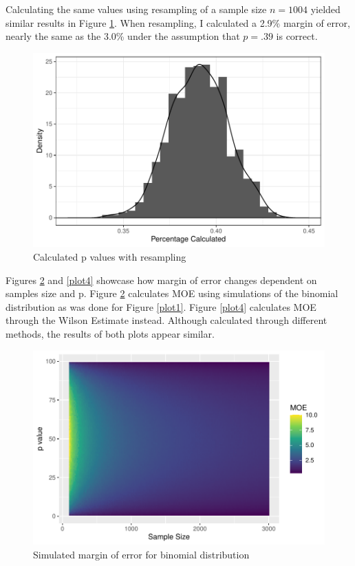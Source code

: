 \documentclass{article}\usepackage[]{graphicx}\usepackage[]{xcolor}
\begin{document}
\begin{multicols}{2}
Calculating the same values using resampling of a sample size $n=1004$ yielded similar results in Figure \ref{plot2}. When resampling, I calculated a 2.9\% margin of error, nearly the same as the 3.0\% under the assumption that $p=.39$ is correct.

\begin{figure}[H]
 \begin{center}
 \includegraphics[scale=0.45]{resample_plot.pdf}
 \caption{Calculated p values with resampling}
 \label{plot2}
 \end{center}
 \end{figure}
 
 Figures \ref{plot3} and \ref{plot4} showcase how margin of error changes dependent on samples size and p. Figure \ref{plot3} calculates MOE using simulations of the binomial distribution as was done for Figure \ref{plot1}. Figure \ref{plot4} calculates MOE through the Wilson Estimate instead. Although calculated through different methods, the results of both plots appear similar.

\begin{figure}[H]
 \begin{center}
 \includegraphics[scale=0.6]{sim_moe.pdf}
 \caption{Simulated margin of error for binomial distribution}
 \label{plot3}
 \end{center}
 \end{figure}


\end{multicols}
\end{document}
